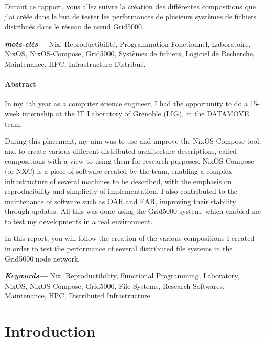 \documentclass[a4paper,french,12pt, titlepage]{article}
\newcommand{\paragraphnewline}[1]{\hypertarget{par#1}{\paragraph{#1}\mbox{}}}
\begin{document}
Durant ce rapport, vous allez suivre la création des différentes
compositions que j'ai créée dans le but de tester les performances de
plusieurs systèmes de fichiers distribués dans le réseau de nœud
Grid5000.


\textbf{\textit{mots-clés---}} Nix, Reproductibilité, Programmation
Fonctionnel, Laboratoire, NixOS, NixOS-Compose, Grid5000, Systèmes de
fichiers, Logiciel de Recherche, Maintenance, HPC, Infrastructure
Distribué.

\begin{center}
    \item \paragraphnewline{Abstract}
\end{center}

In my 4th year as a computer science engineer, I had the opportunity to
do a 15-week internship at the IT Laboratory of Grenoble (LIG), in the
DATAMOVE team.\newline

During this placement, my aim was to use and improve the NixOS-Compose
tool, and to create various different distributed architecture
descriptions, called compositions with a view to using them for research
purposes. NixOS-Compose (or NXC) is a piece of software created by the
team, enabling a complex infrastructure of several machines to be
described, with the emphasis on reproducibility and simplicity of
implementation. I also contributed to the maintenance of software such
as OAR and EAR, improving their stability through updates. All this was
done using the Grid5000 system, which enabled me to test my developments
in a real environment.\newline 

In this report, you will follow the creation of the various compositions
I created in order to test the performance of several distributed file
systems in the Grid5000 node network.

\textbf{\textit{Keywords---}} Nix, Reproductibility, Functional
Programming, Laboratory, NixOS, NixOS-Compose, Grid5000, File Systems,
Research Softwares, Maintenance, HPC, Distributed Infrastructure

\newpage

\tableofcontents
\newpage

\listoffigures

\newpage

\hypertarget{introduction}{%
\section{Introduction}\label{introduction}}
\end{document}
